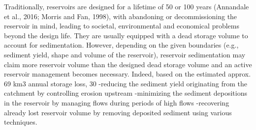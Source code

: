 Traditionally, reservoirs are designed for a lifetime of 50 or 100 years (Annandale et al., 2016; Morris and Fan, 1998), with abandoning or decommissioning the reservoir in mind, leading to societal, environmental and economical problems beyond the design life. They are usually equipped with a dead storage volume to account for sedimentation. However, depending on the given boundaries (e.g., sediment yield, shape and volume of the reservoir), reservoir sedimentation may claim more reservoir volume than the designed dead storage volume and an active reservoir management becomes necessary. Indeed, based on the estimated approx. 69 km3 annual storage loss, 30%
-reducing the sediment yield originating from the catchment by controlling erosion upstream
-minimizing the sediment depositions in the reservoir by managing flows during periods of high flows
-recovering already lost reservoir volume by removing deposited sediment using various techniques.
